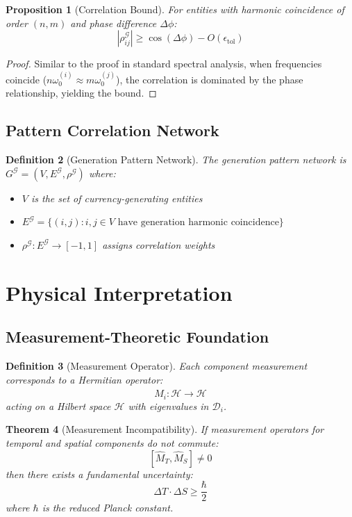 \documentclass[12pt]{article}
\newtheorem{theorem}{Theorem}
\newtheorem{definition}[theorem]{Definition}
\newtheorem{proposition}[theorem]{Proposition}
\begin{document}
\begin{proposition}[Correlation Bound]
For entities with harmonic coincidence of order $(n,m)$ and phase difference $\Delta\phi$:
$$
|\rho_{ij}^{\mathcal{G}}| \geq \cos(\Delta\phi) - O(\epsilon_{\text{tol}})
$$
\end{proposition}

\begin{proof}
Similar to the proof in standard spectral analysis, when frequencies coincide ($n\omega_0^{(i)} \approx m\omega_0^{(j)}$), the correlation is dominated by the phase relationship, yielding the bound.
\end{proof}

\subsection{Pattern Correlation Network}

\begin{definition}[Generation Pattern Network]
The generation pattern network is $G^{\mathcal{G}} = (V, E^{\mathcal{G}}, \rho^{\mathcal{G}})$ where:
\begin{itemize}
    \item $V$ is the set of currency-generating entities
    \item $E^{\mathcal{G}} = \{(i,j): i,j \in V \text{ have generation harmonic coincidence}\}$
    \item $\rho^{\mathcal{G}}: E^{\mathcal{G}} \to [-1,1]$ assigns correlation weights
\end{itemize}
\end{definition}

\section{Physical Interpretation}

\subsection{Measurement-Theoretic Foundation}

\begin{definition}[Measurement Operator]
Each component measurement corresponds to a Hermitian operator:
$$
\hat{M}_i: \mathcal{H} \to \mathcal{H}
$$
acting on a Hilbert space $\mathcal{H}$ with eigenvalues in $\mathcal{D}_i$.
\end{definition}

\begin{theorem}[Measurement Incompatibility]
If measurement operators for temporal and spatial components do not commute:
$$
[\hat{M}_T, \hat{M}_S] \neq 0
$$
then there exists a fundamental uncertainty:
$$
\Delta T \cdot \Delta S \geq \frac{\hbar}{2}
$$
where $\hbar$ is the reduced Planck constant.
\end{theorem}
\end{document}
